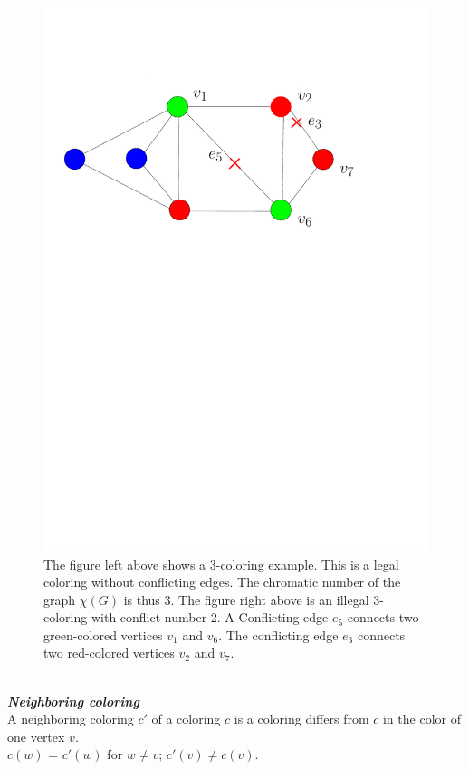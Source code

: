 \documentclass[12pt,a4paper,twoside]{scrartcl}
\numberwithin{equation}{section}
\begin{document}
\begin{figure}[h!]
\begin{minipage}[b]{0.49\textwidth}
  \includegraphics[scale = 0.5]{1/conflict.pdf}
  \end{minipage}
  \caption{
  The figure left above shows a 3-coloring example. This is a legal coloring without conflicting edges. The chromatic number of the graph $\chi(G)$ is thus 3. The figure right above is an illegal 3-coloring with conflict number 2. A Conflicting edge $e_5$ connects two green-colored vertices $v_1$ and $v_6$. The conflicting edge $e_3$ connects two red-colored vertices $v_2$ and $v_7$.}\label{Figure 6}
\end{figure}\\

\emph{\textbf{Neighboring coloring}}\\
A neighboring coloring $c'$ of a coloring $c$ is a coloring differs from $c$ in the color of one vertex $v$.\\
$c(w)$ = $c'(w)$ for $w \neq v$; $c'(v) \neq c(v)$.
\end{document}
